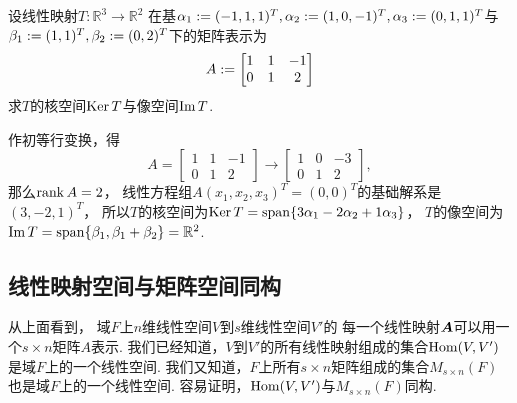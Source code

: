 \begin{example}
设线性映射\(T\colon \mathbb{R}^3 \to \mathbb{R}^2\)
在基\(
	\alpha_1 := (-1,1,1)^T,
	\alpha_2 := (1,0,-1)^T,
	\alpha_3 := (0,1,1)^T
\)与\(
	\beta_1 := (1,1)^T,
	\beta_2 := (0,2)^T
\)下的矩阵表示为\begin{equation*}
	A := \begin{bmatrix}
		1 & 1 & -1 \\
		0 & 1 & 2
	\end{bmatrix}
\end{equation*}
求\(T\)的核空间\(\operatorname{Ker} T\)与像空间\(\operatorname{Im} T\).
\begin{solution}
作初等行变换，得\begin{equation*}
	A
	= \begin{bmatrix}
		1 & 1 & -1 \\
		0 & 1 & 2
	\end{bmatrix}
	\to \begin{bmatrix}
		1 & 0 & -3 \\
		0 & 1 & 2
	\end{bmatrix},
\end{equation*}
那么\(\rank A = 2\)，
线性方程组\(A (x_1,x_2,x_3)^T = (0,0)^T\)的基础解系是\((3,-2,1)^T\)，
所以\(T\)的核空间为\(
	\operatorname{Ker} T
	= \operatorname{span}\{3 \alpha_1 - 2 \alpha_2 + 1 \alpha_3\}
\)，
\(T\)的像空间为\(
	\operatorname{Im} T
	= \operatorname{span}\{
		\beta_1,
		\beta_1 + \beta_2
	\}
	= \mathbb{R}^2
\).
\end{solution}
\end{example}

\subsection{线性映射空间与矩阵空间同构}
从上面看到，
域\(F\)上\(n\)维线性空间\(V\)到\(s\)维线性空间\(V'\)的
每一个线性映射\(\boldsymbol{A}\)可以用一个\(s\times n\)矩阵\(A\)表示.
我们已经知道，\(V\)到\(V'\)的所有线性映射组成的集合\(\operatorname{Hom}(V,V')\)
是域\(F\)上的一个线性空间.
我们又知道，\(F\)上所有\(s\times n\)矩阵组成的集合\(M_{s\times n}(F)\)
也是域\(F\)上的一个线性空间.
容易证明，\(\operatorname{Hom}(V,V')\)与\(M_{s\times n}(F)\)同构.

